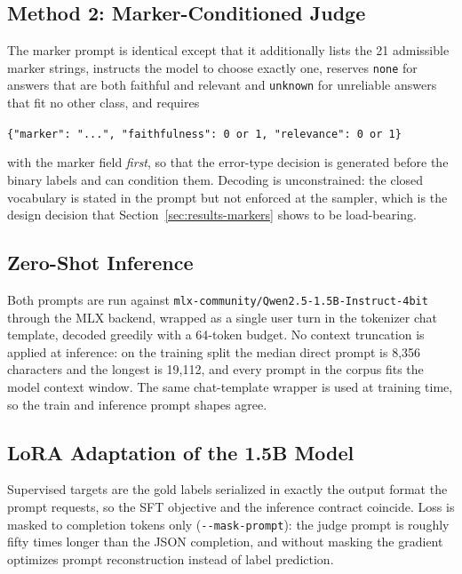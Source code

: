 \documentclass{zapiski}
\begin{document}
\subsection{Method 2: Marker-Conditioned Judge}
\label{sec:m2}

The marker prompt is identical except that it additionally lists the 21
admissible marker strings, instructs the model to choose exactly one,
reserves \texttt{none} for answers that are both faithful and relevant and
\texttt{unknown} for unreliable answers that fit no other class, and requires
\begin{center}
\texttt{\{"marker": "...", "faithfulness": 0 or 1, "relevance": 0 or 1\}}
\end{center}
with the marker field \emph{first}, so that the error-type decision is
generated before the binary labels and can condition them. Decoding is
unconstrained: the closed vocabulary is stated in the prompt but not enforced
at the sampler, which is the design decision that
Section~\ref{sec:results-markers} shows to be load-bearing.

\subsection{Zero-Shot Inference}
\label{sec:zeroshot}

Both prompts are run against
\texttt{mlx-community/Qwen2.5-1.5B-Instruct-4bit} through the MLX backend,
wrapped as a single user turn in the tokenizer chat template, decoded greedily
with a 64-token budget. No context truncation is applied at inference: on the
training split the median direct prompt is 8,356 characters and the longest is
19,112, and every prompt in the corpus fits the model context window. The same chat-template wrapper is used at
training time, so the train and inference prompt shapes agree.

\subsection{LoRA Adaptation of the 1.5B Model}
\label{sec:lora}

Supervised targets are the gold labels serialized in exactly the output format
the prompt requests, so the SFT objective and the inference contract coincide.
Loss is masked to completion tokens only (\texttt{-{}-mask-prompt}): the judge
prompt is roughly fifty times longer than the JSON completion, and without
masking the gradient optimizes prompt reconstruction instead of label
prediction.
\end{document}
